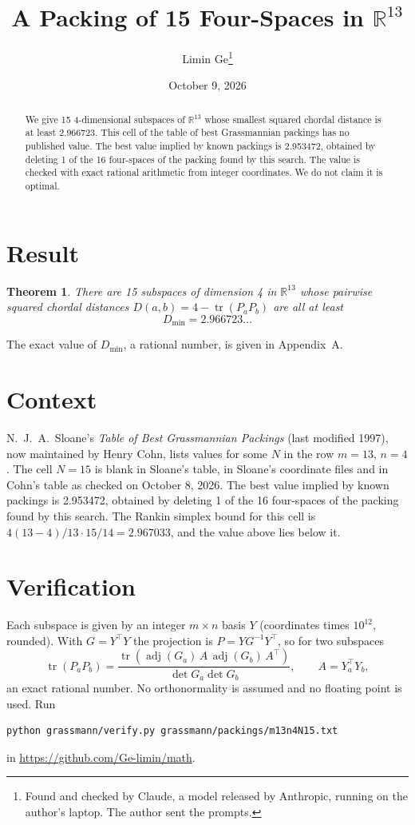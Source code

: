 \documentclass[11pt,a4paper]{article}
\title{A Packing of 15 Four-Spaces in $\mathbb{R}^{13}$}
\author{Limin Ge\thanks{Found and checked by Claude, a model released by Anthropic, running on the author's laptop. The author sent the prompts.}}
\date{October 9, 2026}
\newtheorem*{theorem}{Theorem}
\begin{document}
\maketitle
\begin{abstract}
We give 15 4-dimensional subspaces of $\mathbb{R}^{13}$ whose smallest squared chordal distance is at least 2.966723. This cell of the table of best Grassmannian packings has no published value. The best value implied by known packings is 2.953472, obtained by deleting 1 of the 16 four-spaces of the packing found by this search. The value is checked with exact rational arithmetic from integer coordinates. We do not claim it is optimal.
\end{abstract}

\section{Result}
\begin{theorem}
There are 15 subspaces of dimension 4 in $\mathbb{R}^{13}$ whose pairwise squared chordal distances $D(a,b) = 4 - \operatorname{tr}(P_aP_b)$ are all at least
\[ D_{\min} = 2.966723\ldots \]
\end{theorem}
The exact value of $D_{\min}$, a rational number, is given in Appendix~A.


\section{Context}
N.~J.~A.~Sloane's \emph{Table of Best Grassmannian Packings} (last modified 1997), now maintained by Henry Cohn, lists values for some $N$ in the row $m=13$, $n=4$. The cell $N=15$ is blank in Sloane's table, in Sloane's coordinate files and in Cohn's table as checked on October 8, 2026. The best value implied by known packings is 2.953472, obtained by deleting 1 of the 16 four-spaces of the packing found by this search. The Rankin simplex bound for this cell is $4(13-4)/13\cdot 15/14 = 2.967033$, and the value above lies below it.


\section{Verification}
Each subspace is given by an integer $m\times n$ basis $Y$ (coordinates times $10^{12}$, rounded). With $G=Y^\top Y$ the projection is $P=YG^{-1}Y^\top$, so for two subspaces
\[ \operatorname{tr}(P_aP_b)=\frac{\operatorname{tr}(\operatorname{adj}(G_a)\,A\,\operatorname{adj}(G_b)\,A^\top)}{\det G_a\det G_b},\qquad A=Y_a^\top Y_b, \]
an exact rational number. No orthonormality is assumed and no floating point is used. Run
\begin{verbatim}
python grassmann/verify.py grassmann/packings/m13n4N15.txt
\end{verbatim}
in \url{https://github.com/Ge-limin/math}.
\end{document}
